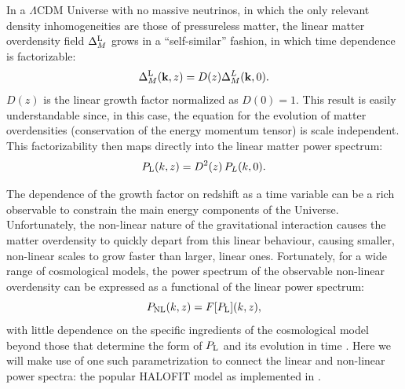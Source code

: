 \documentclass[a4paper,11pt]{article}
\newcommand{\hfit}{\textsc{HALOFIT}\xspace}
\begin{document}
      In a $\Lambda$CDM Universe with no massive neutrinos, in which the only relevant density inhomogeneities are those of pressureless matter, the linear matter overdensity field $\Delta^{\rm L}_M$ grows in a ``self-similar'' fashion, in which time dependence is factorizable:
      \begin{equation}\label{eq:gf_factor}
        \Delta_M^{\rm L}({\bf k},z)=D(z)\Delta_M^L({\bf k},0).
      \end{equation}
      $D(z)$ is the linear growth factor normalized as $D(0)=1$. This result is easily understandable since, in this case, the equation for the evolution of matter overdensities (conservation of the energy momentum tensor) is scale independent. This factorizability then maps directly into the linear matter power spectrum:
      \begin{equation}\label{eq:dz_selfsim}
        P_{\rm L}(k,z)=D^2(z)\,P_L(k,0).
      \end{equation}

      The dependence of the growth factor on redshift as a time variable can be a rich observable to constrain the main energy components of the Universe. Unfortunately, the non-linear nature of the gravitational interaction causes the matter overdensity to quickly depart from this linear behaviour, causing smaller, non-linear scales to grow faster than larger, linear ones. Fortunately, for a wide range of cosmological models, the power spectrum of the observable non-linear overdensity can be expressed as a functional of the linear power spectrum:
      \begin{equation}
        P_{\rm NL}(k,z)=F[P_{\rm L}](k,z),
      \end{equation}
      with little dependence on the specific ingredients of the cosmological model beyond those that determine the form of $P_{\rm L}$ and its evolution in time \citep{astro-ph/9705121,astro-ph/0202358,astro-ph/0505565,astro-ph/0610213,1208.2701,1606.05345}. Here we will make use of one such parametrization to connect the linear and non-linear power spectra: the popular \hfit model as implemented in \cite{1208.2701}.
\end{document}

